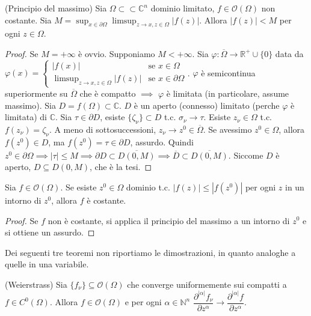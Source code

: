 \begin{thm}
  (Principio del massimo) Sia $\Omega \subset\subset \mathbb{C}^n$ dominio limitato, $f \in \mathcal{O}(\Omega)$ non costante. Sia $\displaystyle M=\sup_{x \in \partial \Omega} \limsup_{z \longrightarrow x, z \in \Omega} |f(z)|$. Allora $|f(z)|<M$ per ogni $z \in \Omega$.
\end{thm}

\begin{proof}
  Se $M=+\infty$ è ovvio. Supponiamo $M<+\infty$. Sia $\varphi: \overline{\Omega} \longrightarrow \mathbb{R}^+\cup\{0\}$ data da $\varphi(x)=\begin{cases}
    |f(x)| & \mbox{se }x\in\Omega \\ \limsup_{z \longrightarrow x, z \in \Omega} |f(z)| & \mbox{se }x \in \partial\Omega
\end{cases}$. $\varphi$ è semicontinua superiormente su $\overline{\Omega}$ che è compatto $\implies$ $\varphi$ è limitata (in particolare, assume massimo).
Sia $D=f(\Omega) \subset \mathbb{C}$. $D$ è un aperto (connesso) limitato (perche $\varphi$ è limitata) di $\mathbb{C}$. Sia $\tau \in \partial D$, esiste $\{\zeta_{\nu}\} \subset D$ t.c. $\sigma_{\nu} \longrightarrow \tau$. Esiste $z_{\nu} \in \Omega$ t.c. $f(z_{\nu})=\zeta_{\nu}$.
A meno di sottosuccessioni, $z_{\nu} \longrightarrow z^0 \in \overline{\Omega}$. Se avessimo $z^0 \in \Omega$, allora $f(z^0) \in D$, ma $f(z^0)=\tau \in \partial D$, assurdo.
Quindi $z^0 \in \partial\Omega \implies |\tau| \le M \implies \partial D \subset \overline{D(0,M)} \implies \overline{D} \subset \overline{D(0,M)}$. Siccome $D$ è aperto, $D \subseteq D(0,M)$, che è la tesi.
\end{proof}

\begin{cor}
  Sia $f \in \mathcal{O}(\Omega)$. Se esiste $z^0 \in \Omega$ dominio t.c. $|f(z)| \le |f(z^0)|$ per ogni $z$ in un intorno di $z^0$, allora $f$ è costante.
\end{cor}

\begin{proof}
  Se $f$ non è costante, si applica il principio del massimo a un intorno di $z^0$ e si ottiene un assurdo.
\end{proof}

Dei seguenti tre teoremi non riportiamo le dimostrazioni, in quanto analoghe a quelle in una variabile.

\begin{thm}
  (Weierstrass) Sia $\{f_{\nu}\} \subseteq \mathcal{O}(\Omega)$ che converge uniformemente sui compatti a $f \in C^0(\Omega)$. Allora $f \in \mathcal{O}(\Omega)$ e per ogni $\alpha \in \mathbb{N}^n$ $\dfrac{\partial^{|\alpha|}f_{\nu}}{\partial z^\alpha} \longrightarrow \dfrac{\partial^{|\alpha|}f}{\partial z^\alpha}$.
\end{thm}

